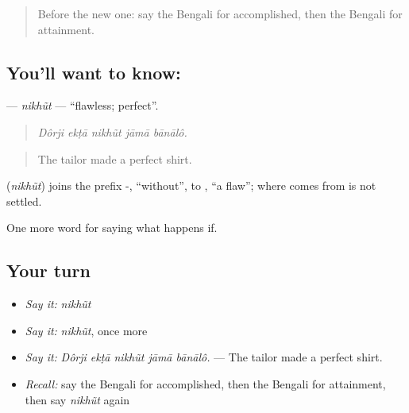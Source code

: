 \label{lesson:BN-C543-nikhut}



\begin{quote}
Before the new one: say the Bengali for accomplished, then the Bengali for attainment.
\end{quote}

\subsection*{You'll want to know: }
\textbf{} — \emph{nikhũt} — \textquotedblleft{}flawless; perfect\textquotedblright{}.

\begin{quote}
    
\end{quote}

\begin{quote}
\emph{Dôrji ekṭā nikhũt jāmā bānālô.}
\end{quote}

\begin{quote}
The tailor made a perfect shirt.
\end{quote}

\begin{cousinweb}
\textbf{} (\emph{nikhũt}) joins the prefix -, \textquotedblleft{}without\textquotedblright{}, to , \textquotedblleft{}a flaw\textquotedblright{}; where  comes from is not settled.
\end{cousinweb}

\begin{grammarlens}[title={What you've built}]
One more word for saying what happens if.
\end{grammarlens}

\subsection*{Your turn}
\begin{itemize}
\raggedright
  \item \emph{Say it:} \emph{nikhũt}
  \item \emph{Say it:} \emph{nikhũt}, once more
  \item \emph{Say it:} \emph{Dôrji ekṭā nikhũt jāmā bānālô.} — The tailor made a perfect shirt.
  \item \emph{Recall:} say the Bengali for accomplished, then the Bengali for attainment, then say \emph{nikhũt} again
\end{itemize}


